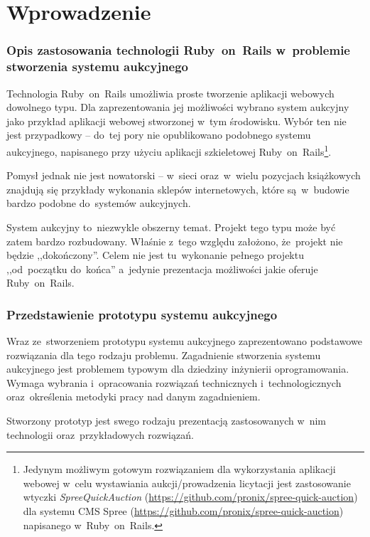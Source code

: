 \section{Wprowadzenie}

\subsubsection{Opis zastosowania technologii Ruby~on~Rails w~problemie stworzenia systemu aukcyjnego}

Technologia Ruby~on~Rails umożliwia proste tworzenie aplikacji webowych dowolnego typu. Dla zaprezentowania jej możliwości wybrano system aukcyjny jako przykład aplikacji webowej stworzonej w~tym środowisku. Wybór ten nie jest przypadkowy -- do~tej pory nie opublikowano podobnego systemu aukcyjnego, napisanego przy użyciu aplikacji szkieletowej Ruby~on~Rails\footnote{Jedynym możliwym gotowym rozwiązaniem dla wykorzystania aplikacji webowej w~celu wystawiania aukcji/prowadzenia licytacji jest zastosowanie wtyczki \textit{SpreeQuickAuction} (\url{https://github.com/pronix/spree-quick-auction}) dla systemu CMS Spree (\url{https://github.com/pronix/spree-quick-auction}) napisanego w~Ruby~on~Rails.}.


Pomysł jednak nie jest nowatorski -- w~sieci oraz~w~wielu pozycjach książkowych znajdują się przykłady wykonania sklepów internetowych, które są~w~budowie bardzo podobne do~systemów aukcyjnych.


System aukcyjny to~niezwykle obszerny temat. Projekt tego typu może być zatem bardzo rozbudowany. Właśnie z~tego względu założono, że~projekt nie będzie ,,dokończony''. Celem nie jest tu~wykonanie pełnego projektu ,,od~początku do~końca'' a~jedynie prezentacja możliwości jakie oferuje Ruby~on~Rails.

\subsubsection{Przedstawienie prototypu systemu aukcyjnego}

Wraz ze~stworzeniem prototypu systemu aukcyjnego zaprezentowano podstawowe roz\-wią\-za\-nia dla tego rodzaju problemu. Zagadnienie stworzenia systemu aukcyjnego jest problemem typowym dla dziedziny inżynierii oprogramowania. Wymaga wybrania i~opracowania rozwiązań technicznych i~technologicznych oraz~określenia metodyki pracy nad danym zagadnieniem.


Stworzony prototyp jest swego rodzaju prezentacją zastosowanych w~nim technologii oraz~przykładowych rozwiązań.
